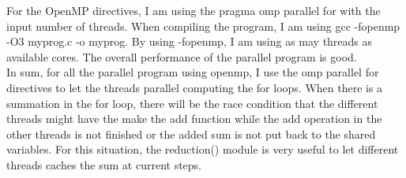 \documentclass[12pt]{article}
\begin{document}
For the OpenMP directives, I am using the pragma omp parallel for with the input number of threads. When compiling the program, I am using gcc -fopenmp -O3 myprog.c -o myprog. By using -fopenmp, I am using as may threads as available cores. The overall performance of the parallel program is good.\\

In sum, for all the parallel program using openmp, I use the omp parallel for directives to let the threads parallel computing the for loops. When there is a summation in the for loop, there will be the race condition that the different threads might have the make the add function while the add operation in the other threads is not finished or the added sum is not put back to the shared variables. For this situation, the reduction() module is very useful to let different threads caches the sum at current steps.


%
%
%
\end{document}
